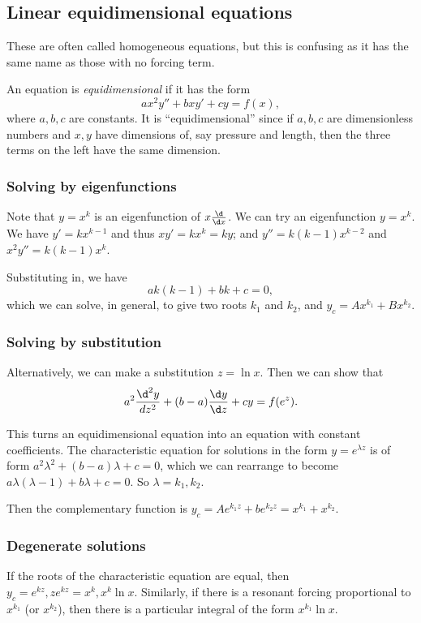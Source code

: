 \documentclass[a4paper]{article}
\begin{document}
\subsection{Linear equidimensional equations}
\note These are often called homogeneous equations, but this is confusing as it has the same name as those with no forcing term.

\begin{defi}
  An equation is \emph{equidimensional} if it has the form
  \[
  ax^2y'' + bxy' + cy = f(x),
  \]
  where $a, b, c$ are constants. It is ``equidimensional'' since if $a, b, c$ are dimensionless numbers and $x, y$ have dimensions of, say pressure and length, then the three terms on the left have the same dimension.
\end{defi}

\subsubsection{Solving by eigenfunctions}
Note that $y = x^k$ is an eigenfunction of $x\frac{\d}{\d x}$. We can try an eigenfunction $y = x^k$. We have $y' = kx^{k - 1}$ and thus $xy' = kx^k = ky$; and $y'' = k(k - 1)x^{k - 2}$ and $x^2y'' = k(k - 1)x^k$.

Substituting in, we have
\[
ak(k - 1) + bk + c = 0,
\]
which we can solve, in general, to give two roots $k_1$ and $k_2$, and $y_c = Ax^{k_1} + Bx^{k_2}$.

\subsubsection{Solving by substitution}
Alternatively, we can make a substitution $z = \ln x$. Then we can show that 
\[
a^2\frac{\d ^2 y}{d z^2} + (b - a)\frac{\d y}{\d z} + cy = f(e^z).
\]

This turns an equidimensional equation into an equation with constant coefficients. The characteristic equation for solutions in the form $y = e^{\lambda z}$ is of form $a^2\lambda^2 + (b - a)\lambda + c = 0$, which we can rearrange to become $a\lambda(\lambda - 1) + b\lambda + c = 0$. So $\lambda = k_1, k_2$.

Then the complementary function is $y_c = Ae^{k_1z} + be^{k_2z} = x^{k_1} + x^{k_2}$.

\subsubsection{Degenerate solutions}
If the roots of the characteristic equation are equal, then $y_c = e^{kz}, ze^{kz} = x^k, x^k\ln x$. Similarly, if there is a resonant forcing proportional to $x^{k_1}$ (or $x^{k_2}$), then there is a particular integral of the form $x^{k_1}\ln x$.
\end{document}

